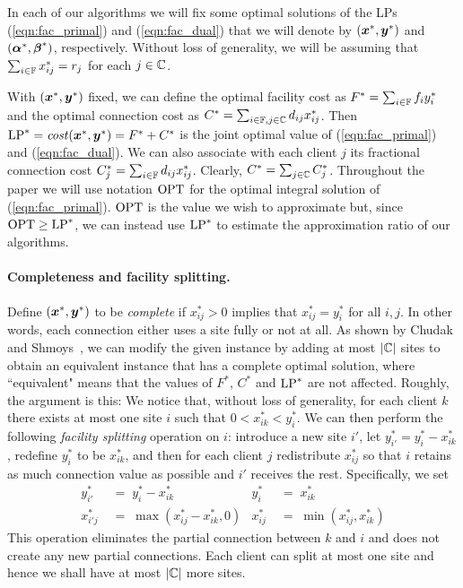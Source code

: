 \documentclass[11pt]{article}
\begin{document}
In each of our algorithms we will fix some optimal
solutions of the LPs (\ref{eqn:fac_primal}) and (\ref{eqn:fac_dual})
that we will denote by $(\boldsymbol{x}^\ast, \boldsymbol{y}^\ast)$ and
$(\boldsymbol{\alpha}^\ast,\boldsymbol{\beta}^\ast)$, respectively. Without loss of generality, we
will be assuming that $\sum_{i\in \mathbb{F}} x^\ast_{ij} = r_j$ for each 
$j\in\mathbb{C}$.

With $(\boldsymbol{x}^\ast, \boldsymbol{y}^\ast)$ fixed, we can define the
optimal facility cost as $F^\ast=\sum_{i\in\mathbb{F}} f_i
y_i^\ast$ and the optimal connection cost as $C^\ast =
\sum_{i\in\mathbb{F},j\in\mathbb{C}} d_{ij}x_{ij}^\ast$.
Then $\mbox{\rm LP}^\ast = {\it cost}(\boldsymbol{x}^\ast,\boldsymbol{y}^\ast) = F^\ast+C^\ast$
is the joint optimal value of (\ref{eqn:fac_primal}) and
(\ref{eqn:fac_dual}).  We can also associate with each
client $j$ its fractional connection cost $C^\ast_j =
\sum_{i\in\mathbb{F}} d_{ij}x_{ij}^\ast$.  Clearly, $C^\ast =
\sum_{j\in\mathbb{C}} C^\ast_j$.  Throughout the paper we
will use notation $\mbox{\rm OPT}$ for the optimal integral solution
of (\ref{eqn:fac_primal}).  $\mbox{\rm OPT}$ is the value we wish to
approximate but, since $\mbox{\rm OPT}\ge\mbox{\rm LP}^\ast$, we can instead use
$\mbox{\rm LP}^\ast$ to estimate the approximation ratio of our
algorithms.


\paragraph{Completeness and facility splitting.}
Define $(\boldsymbol{x}^\ast, \boldsymbol{y}^\ast)$ to be \emph{complete} if
$x_{ij}^\ast>0$ implies that $x_{ij}^\ast=y_i^\ast$ for all
$i,j$. In other words, each connection either uses a site
fully or not at all.  As shown by Chudak and
Shmoys~\cite{ChudakS04}, we can modify the given instance by
adding at most $|\mathbb{C}|$ sites to obtain an equivalent
instance that has a complete optimal solution, where
``equivalent" means that the values of $F^\ast$, $C^\ast$ and
$\mbox{\rm LP}^\ast$ are not affected. Roughly, the
argument is this: We notice that, without loss of
generality, for each client $k$ there exists at most one
site $i$ such that $0 < x_{ik}^\ast < y_i^\ast$.  We can
then perform the following \emph{facility splitting}
operation on $i$: introduce a new site $i'$, let
$y^\ast_{i'} = y^\ast_i - x^\ast_{ik}$, redefine $y^\ast_i$
to be $x^\ast_{ik}$, and then for each client $j$
redistribute $x^\ast_{ij}$ so that $i$ retains as much
connection value as possible and $i'$ receives the
rest. Specifically, we set
%
\begin{align*}
  y^\ast_{i'} \;&=\; y^\ast_i - x^\ast_{ik}  & y^\ast_{i} \;&=\; x^\ast_{ik}
	\\
  x^\ast_{i'j} \;&=\;\max( x^\ast_{ij} - x^\ast_{ik}, 0 )	& x^\ast_{ij} \;&=\; \min( x^\ast_{ij} , x^\ast_{ik}) 
\end{align*}
%
This operation eliminates the partial connection between $k$ and $i$ and does not create
any new partial connections. Each client can split at
most one site and hence we shall have at most $|\mathbb{C}|$ more sites.
\end{document}
